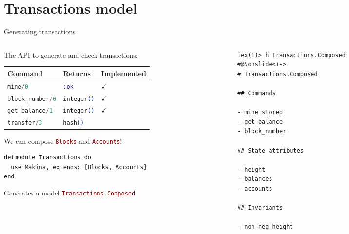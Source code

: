 \documentclass[aspectratio=169, 10pt]{beamer}
\begin{document}
\section{Transactions model}
\label{sec:orga2d94fc}
\begin{frame}[label={sec:orgd6f1f36},fragile]{Generating transactions}
 \begin{columns}
\begin{column}{0.48\columnwidth}
\onslide<+->
\onslide<+->
The API to generate and check transactions:
\onslide<+->
\begin{center}
\begin{tabular}{lll}
Command & Returns & Implemented\\
\hline
\lstinline[language=elixir, style=display]~mine/0~ & \lstinline[language=elixir, style=display]~:ok~ & \(\checkmark\)\\
\lstinline[language=elixir, style=display]~block_number/0~ & \lstinline[language=elixir, style=display]~integer()~ & \(\checkmark\)\\
\lstinline[language=elixir, style=display]~get_balance/1~ & \lstinline[language=elixir, style=display]~integer()~ & \(\checkmark\)\\
\lstinline[language=elixir, style=display]~transfer/3~ & \lstinline[language=elixir, style=display]~hash()~ & \\
\end{tabular}
\end{center}
\onslide<+->
We can compose \lstinline[language=elixir, style=display]~Blocks~ and \lstinline[language=elixir, style=display]~Accounts~!
\onslide<+->
\lstset{language=elixir,label= ,caption= ,captionpos=b,numbers=none,style=display}
\begin{lstlisting}
defmodule Transactions do
  use Makina, extends: [Blocks, Accounts]
end
\end{lstlisting}
\onslide<+->
Generates a model \lstinline[language=elixir, style=display]~Transactions.Composed~.
\end{column}

\begin{column}{0.48\columnwidth}
\onslide<+->
\lstset{language=bash,label= ,caption= ,captionpos=b,numbers=none,style=shell}
\begin{lstlisting}
iex(1)> h Transactions.Composed
#@\onslide<+->
# Transactions.Composed

## Commands

- mine stored
- get_balance
- block_number

## State attributes

- height
- balances
- accounts

## Invariants

- non_neg_height

\end{lstlisting}
\end{column}
\end{columns}
\end{frame}
\end{document}
